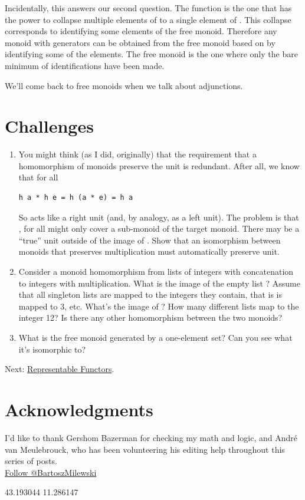Incidentally, this answers our second question. The function
 is the one that has the power to collapse multiple
elements of  to a single element of . This
collapse corresponds to identifying some elements of the free monoid.
Therefore any monoid with generators  can be obtained from the
free monoid based on  by identifying some of the elements. The
free monoid is the one where only the bare minimum of identifications
have been made.

We'll come back to free monoids when we talk about adjunctions.

\section{Challenges}\label{challenges}

\begin{enumerate}
\item
  You might think (as I did, originally) that the requirement that a
  homomorphism of monoids preserve the unit is redundant. After all, we
  know that for all 

\begin{Verbatim}[commandchars=\\\{\}]
h a * h e = h (a * e) = h a
\end{Verbatim}

  So  acts like a right unit (and, by analogy, as a left
  unit). The problem is that , for all  might
  only cover a sub-monoid of the target monoid. There may be a ``true''
  unit outside of the image of . Show that an isomorphism
  between monoids that preserves multiplication must automatically
  preserve unit.
\item
  Consider a monoid homomorphism from lists of integers with
  concatenation to integers with multiplication. What is the image of
  the empty list \code{{[}{]}}? Assume that all singleton lists are
  mapped to the integers they contain, that is \code{{[}3{]}} is
  mapped to 3, etc. What's the image of \code{{[}1,\ 2,\ 3,\ 4{]}}?
  How many different lists map to the integer 12? Is there any other
  homomorphism between the two monoids?
\item
  What is the free monoid generated by a one-element set? Can you see
  what it's isomorphic to?
\end{enumerate}

Next:
\href{https://bartoszmilewski.com/2015/07/29/representable-functors/}{Representable
Functors}.

\section{Acknowledgments}\label{acknowledgments}

I'd like to thank Gershom Bazerman for checking my math and logic, and
André van Meulebrouck, who has been volunteering his editing help
throughout this series of posts.\\
\href{https://twitter.com/BartoszMilewski}{Follow @BartoszMilewski}

{43.193044} {11.286147}
